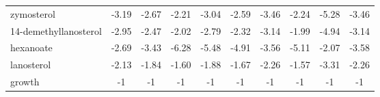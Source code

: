 \begin{table}[H]
\begin{center}
{\begin{tabular}{|lccccccccc|}
zymosterol                                                                        & -3.19  & -2.67  & -2.21  & -3.04   & -2.59  & -3.46  & -2.24  & -5.28   & -3.46   \\
14-demethyllanosterol                                                             & -2.95  & -2.47  & -2.02  & -2.79   & -2.32  & -3.14  & -1.99  & -4.94   & -3.14   \\
hexanoate                                                                         & -2.69  & -3.43  & -6.28  & -5.48   & -4.91  & -3.56  & -5.11  & -2.07   & -3.58   \\
lanosterol                                                                        & -2.13  & -1.84  & -1.60  & -1.88   & -1.67  & -2.26  & -1.57  & -3.31   & -2.26   \\
growth                                                                            & -1     & -1     & -1     & -1      & -1     & -1     & -1     & -1      & -1      \\ \hline
\end{tabular}}
\label{table:fba_shadowprices_free_table}
\end{center}
\end{table}
